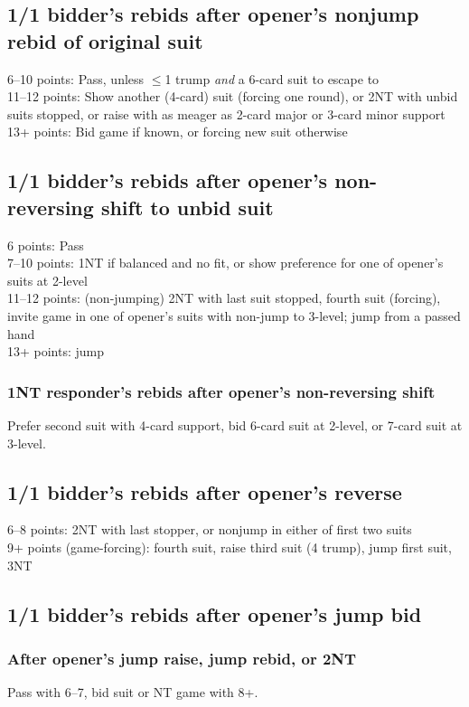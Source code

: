 \documentclass[oneside]{memoir}
\let\TeXle\le
\def\le{$\TeXle$}
\begin{document}
\subsection{1/1 bidder's rebids after opener's nonjump rebid of original suit}
6--10 points: Pass, unless \le1 trump \emph{and} a 6-card suit to escape to\\
11--12 points: Show another (4-card) suit (forcing one round), or 2NT with
unbid suits stopped, or raise with as meager as 2-card major or 3-card minor 
support\\
13+ points: Bid game if known, or forcing new suit otherwise

\subsection{1/1 bidder's rebids after opener's non-reversing shift to unbid suit}
6 points: Pass\\
7--10 points: 1NT if balanced and no fit, or show preference for one of opener's suits at 2-level\\
11--12 points: (non-jumping) 2NT with last suit stopped, fourth suit (forcing),
invite game in one of opener's suits with non-jump to 3-level; jump from a 
passed hand\\
13+ points: jump
\subsubsection{1NT responder's rebids after opener's non-reversing shift}
Prefer second suit with 4-card support, bid 6-card suit at 2-level, or 7-card
suit at 3-level.

\subsection{1/1 bidder's rebids after opener's reverse}
6--8 points: 2NT with last stopper, or nonjump in either of first two suits\\
9+ points (game-forcing): fourth suit, raise third suit (4 trump), jump first suit, 3NT

\subsection{1/1 bidder's rebids after opener's jump bid}
\subsubsection{After opener's jump raise, jump rebid, or 2NT}
Pass with 6--7, bid suit or NT game with 8+.
\end{document}
